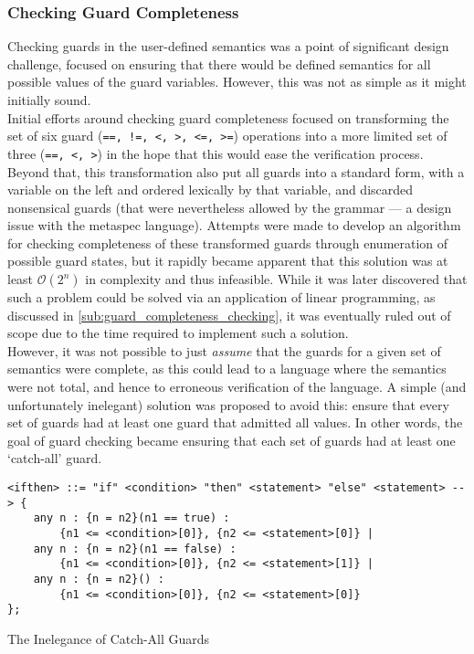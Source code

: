 \subsubsection{Checking Guard Completeness} %
\label{ssub:checking_guard_completeness}
Checking guards in the user-defined semantics was a point of significant design challenge, focused on ensuring that there would be defined semantics for all possible values of the guard variables. 
However, this was not as simple as it might initially sound.\\

Initial efforts around checking guard completeness focused on transforming the set of six guard (\texttt{==, !=, <, >, <=, >=}) operations into a more limited set of three (\texttt{==, <, >}) in the hope that this would ease the verification process.
Beyond that, this transformation also put all guards into a standard form, with a variable on the left and ordered lexically by that variable, and discarded nonsensical guards (that were nevertheless allowed by the grammar --- a design issue with the \gls{metaspec} language). 
Attempts were made to develop an algorithm for checking completeness of these transformed guards through enumeration of possible guard states, but it rapidly became apparent that this solution was at least $\mathcal{O}(2^n)$ in complexity and thus infeasible. 
While it was later discovered that such a problem could be solved via an application of linear programming, as discussed in \autoref{sub:guard_completeness_checking}, it was eventually ruled out of scope due to the time required to implement such a solution.\\

However, it was not possible to just \textit{assume} that the guards for a given set of semantics were complete, as this could lead to a language where the semantics were not total, and hence to erroneous verification of the language.
A simple (and unfortunately inelegant) solution was proposed to avoid this: ensure that every set of guards had at least one guard that admitted all values.
In other words, the goal of guard checking became ensuring that each set of guards had at least one `catch-all' guard. 

\begin{listing}[!htb]
\begin{verbatim}
<ifthen> ::= "if" <condition> "then" <statement> "else" <statement> --> {
    any n : {n = n2}(n1 == true) :
        {n1 <= <condition>[0]}, {n2 <= <statement>[0]} |
    any n : {n = n2}(n1 == false) :
        {n1 <= <condition>[0]}, {n2 <= <statement>[1]} |
    any n : {n = n2}() :
        {n1 <= <condition>[0]}, {n2 <= <statement>[0]}
};
\end{verbatim}
\caption{The Inelegance of Catch-All Guards}
\label{lst:the_inelegance_of_catch_all_guards}
\end{listing}

